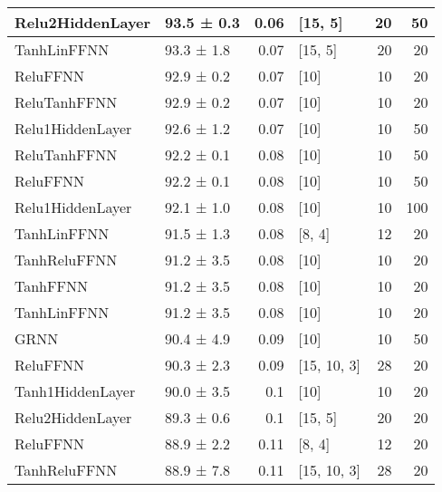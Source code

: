 \begin{longtable}{llrlrr}
 \hline
Relu2HiddenLayer                    & 93.5 ± 0.3  &  0.06 & [15, 5]        &         20 &       50 \\
 \hline
TanhLinFFNN                         & 93.3 ± 1.8  &  0.07 & [15, 5]        &         20 &       20 \\
 \hline
ReluFFNN                            & 92.9 ± 0.2  &  0.07 & [10]           &         10 &       20 \\
 \hline
ReluTanhFFNN                        & 92.9 ± 0.2  &  0.07 & [10]           &         10 &       20 \\
 \hline
Relu1HiddenLayer                    & 92.6 ± 1.2  &  0.07 & [10]           &         10 &       50 \\
 \hline
ReluTanhFFNN                        & 92.2 ± 0.1  &  0.08 & [10]           &         10 &       50 \\
 \hline
ReluFFNN                            & 92.2 ± 0.1  &  0.08 & [10]           &         10 &       50 \\
 \hline
Relu1HiddenLayer                    & 92.1 ± 1.0  &  0.08 & [10]           &         10 &      100 \\
 \hline
TanhLinFFNN                         & 91.5 ± 1.3  &  0.08 & [8, 4]         &         12 &       20 \\
 \hline
TanhReluFFNN                        & 91.2 ± 3.5  &  0.08 & [10]           &         10 &       20 \\
 \hline
TanhFFNN                            & 91.2 ± 3.5  &  0.08 & [10]           &         10 &       20 \\
 \hline
TanhLinFFNN                         & 91.2 ± 3.5  &  0.08 & [10]           &         10 &       20 \\
 \hline
GRNN                                & 90.4 ± 4.9  &  0.09 & [10]           &         10 &       50 \\
 \hline
ReluFFNN                            & 90.3 ± 2.3  &  0.09 & [15, 10, 3]    &         28 &       20 \\
 \hline
Tanh1HiddenLayer                    & 90.0 ± 3.5  &  0.1  & [10]           &         10 &       20 \\
 \hline
Relu2HiddenLayer                    & 89.3 ± 0.6  &  0.1  & [15, 5]        &         20 &       20 \\
 \hline
ReluFFNN                            & 88.9 ± 2.2  &  0.11 & [8, 4]         &         12 &       20 \\
 \hline
TanhReluFFNN                        & 88.9 ± 7.8  &  0.11 & [15, 10, 3]    &         28 &       20 \\

\end{longtable}
